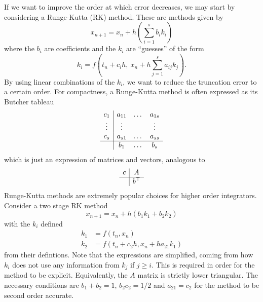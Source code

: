 If we want to improve the order at which error decreases, we may start by considering a Runge-Kutta (RK) method.
These are methods given by
\begin{equation*}
	x_{n+1} = x_n + h \left( \sum_{i = 1}^{s} b_i k_i \right)
\end{equation*}
where the $b_i$ are coefficients and the $k_i$ are ``guesses'' of the form
\begin{equation*}
	k_i = f \left( t_n + c_i h,~ x_n + h\sum_{j = 1}^{s} a_{ij}k_j \right).	
\end{equation*}
By using linear combinations of the $k_i$, we want to reduce the truncation error to a certain order.
For compactness, a Runge-Kutta method is often expressed as its Butcher tableau
\begin{equation*}
	\begin{array}{c|ccc}
		c_1  &a_{11} &\dots &a_{1s} \\
		\vdots &\vdots & &\vdots \\
		c_s &a_{s1} &\dots &a_{ss} \\
		\hline
		&b_1 &\dots &b_s
	\end{array}
\end{equation*}
which is just an expression of matrices and vectors, analogous to
\begin{equation*}
    \begin{array}{c|c}
		c  &A \\
		\hline
		&b^\top
	\end{array}
\end{equation*}
Runge-Kutta methods are extremely popular choices for higher order integrators.
Consider a two stage RK method
\begin{equation*}
    x_{n+1} = x_n + h (b_1 k_1 + b_2 k_2)
\end{equation*}
with the $k_i$ defined
\begin{equation*}
    \begin{aligned}
        k_1 &= f \left( t_n, x_n \right) \\
        k_2 &= f \left( t_n + c_2 h, x_n + h a_{21}k_1 \right)
    \end{aligned}
\end{equation*}
from their defintions. Note that the expressions are simplified, coming from how $k_i$ does not use any information from $k_j$ if $j \geq i$.
This is required in order for the method to be explicit.
Equivalently, the $A$ matrix is strictly lower triangular.
The necessary conditions \cite{iserles2009rk} are $b_1 + b_2 = 1$, $b_2 c_2 = 1/2$ and $a_{21} = c_2$ for the method to be second order accurate.
